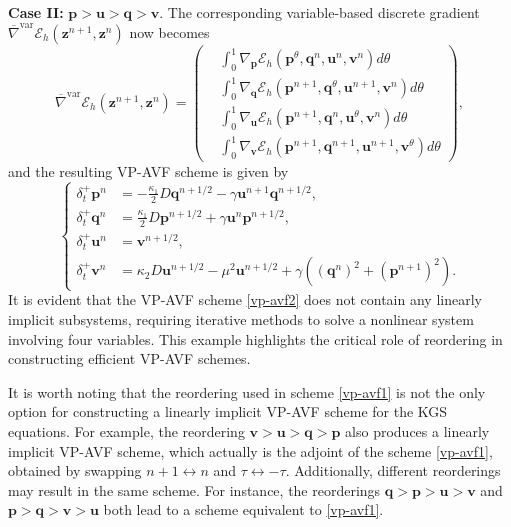 \documentclass[fleqn,11pt]{elsarticle}
\numberwithin{equation}{section}
\begin{document}
	{\bf Case II:} $\bm p>\bm u>\bm q>\bm v$. The corresponding variable-based discrete gradient $\overline{\nabla}^{\text{var}}\mathcal{E}_h(\bm z^{n+1},\bm z^{n})$ now becomes
\begin{equation*}
	\overline{\nabla}^{\text{var}}\mathcal{E}_h(\bm z^{n+1},\bm z^{n})=\left(\begin{aligned}
			 & \int_0^1{\nabla}_{\bm p}\mathcal{E}_h(\bm p^{\theta},\bm q^n,\bm u^n,\bm v^n)d\theta             \\
			 & \int_0^1{\nabla}_{\bm q}\mathcal{E}_h(\bm p^{n+1},\bm q^{\theta},\bm u^{n+1},\bm v^n)d\theta     \\
			 & \int_0^1{\nabla}_{\bm u}\mathcal{E}_h(\bm p^{n+1},\bm q^{n},\bm u^{\theta},\bm v^n)d\theta       \\
			 & \int_0^1{\nabla}_{\bm v}\mathcal{E}_h(\bm p^{n+1},\bm q^{n+1},\bm u^{n+1},\bm v^{\theta})d\theta
		\end{aligned}\right),
\end{equation*}
and the resulting VP-AVF scheme is given by
\begin{equation}\label{vp-avf2}
	\left\{\begin{aligned}
		\delta_t^+\bm p^{n} & =-\frac{\kappa_1}{2} D \bm q^{n+1/2} - \gamma \bm u^{n+1} \bm q^{n+1/2},                               \\
		\delta_t^+\bm q^{n} & =\frac{\kappa_1}{2} D \bm p^{n+1/2} + \gamma \bm u^n \bm p^{n+1/2},                                    \\
		\delta_t^+\bm u^{n} & =\bm v^{n+1/2},                                                                                        \\
		\delta_t^+\bm v^{n} & =\kappa_2 D \bm u^{n+1/2} - \mu^2 \bm u^{n+1/2} + \gamma \left((\bm q^{n})^2 + (\bm p^{n+1})^2\right).
	\end{aligned}\right.
\end{equation}
It is evident that the VP-AVF scheme \eqref{vp-avf2} does not contain any linearly implicit subsystems, requiring iterative methods to solve a nonlinear system involving four variables. This example highlights the critical role of reordering in constructing efficient VP-AVF schemes.


It is worth noting that the reordering used in scheme \eqref{vp-avf1} is not the only option for constructing a linearly implicit VP-AVF scheme for the KGS equations. For example, the reordering $\bm{v} > \bm{u} > \bm{q} > \bm{p}$ also produces a linearly implicit VP-AVF scheme, which actually is the adjoint of the scheme \eqref{vp-avf1}, obtained by swapping $n+1 \leftrightarrow n$ and $\tau \leftrightarrow -\tau$. Additionally, different reorderings may result in the same scheme. For instance, the reorderings $\bm{q} > \bm{p} > \bm{u} > \bm{v}$ and $\bm{p} > \bm{q} > \bm{v} > \bm{u}$ both lead to a scheme equivalent to \eqref{vp-avf1}.
\end{document}
